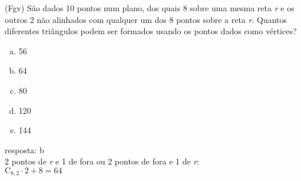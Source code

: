 \begin{ex}
 	(Fgv) São dados 10 pontos num plano, dos quais 8 sobre uma mesma reta \textit{r} e os outros 2 não alinhados com qualquer um dos 8 pontos sobre a reta  \textit{r}. Quantos diferentes triângulos podem ser formados usando os pontos dados como vértices?
    \begin{enumerate}[(a)]
    \item 56
    \item 64
    \item 80
    \item 120
    \item 144
    \end{enumerate}
      \begin{sol}
        resposta: b \\
        2 pontos de \textit{r} e 1 de fora ou 2 pontos de  fora e 1 de \textit{r}:\\
        $\mathrm{C}_{8,2}\cdot2+8=64$
      \end{sol}
\end{ex}